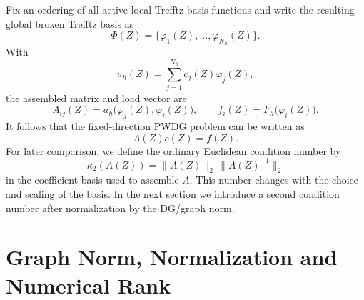 \documentclass[pdflatex,sn-mathphys-num]{sn-jnl}
\theoremstyle{thmstyleone}
\theoremstyle{thmstyletwo}
\begin{document}
Fix an ordering of all active local Trefftz basis functions and write the resulting global broken Trefftz basis as
\[
 \Phi(Z)=\{\varphi_1(Z),\ldots,\varphi_{N_h}(Z)\}.
\]
With
\[
 u_h(Z)=\sum_{j=1}^{N_h}c_j(Z)\varphi_j(Z),
\]
the assembled matrix and load vector are
\begin{equation}\label{eq:matrix-def}
 A_{ij}(Z)=a_h\big(\varphi_j(Z),\varphi_i(Z)\big),
 \qquad
 f_i(Z)=F_h\big(\varphi_i(Z)\big).
\end{equation}
It follows that the fixed-direction PWDG problem can be written as
\begin{equation}\label{eq:matrix-system}
 A(Z)c(Z)=f(Z).
\end{equation}
For later comparison, we define the ordinary Euclidean condition number by
\begin{equation}\label{eq:kappaA}
 \kappa_2(A(Z))=\|A(Z)\|_2\,\|A(Z)^{-1}\|_2
\end{equation}
in the coefficient basis used to assemble $A$.  This number changes with the choice and scaling of the basis.  In the next section we introduce a second condition number after normalization by the DG/graph norm.

\section{Graph Norm, Normalization and Numerical Rank}\label{sec:graph}
\end{document}
